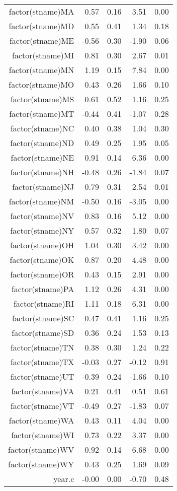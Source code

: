 \begin{table}[ht]
\begin{tabular}{rrrrr}
  factor(stname)MA & 0.57 & 0.16 & 3.51 & 0.00 \\ 
  factor(stname)MD & 0.55 & 0.41 & 1.34 & 0.18 \\ 
  factor(stname)ME & -0.56 & 0.30 & -1.90 & 0.06 \\ 
  factor(stname)MI & 0.81 & 0.30 & 2.67 & 0.01 \\ 
  factor(stname)MN & 1.19 & 0.15 & 7.84 & 0.00 \\ 
  factor(stname)MO & 0.43 & 0.26 & 1.66 & 0.10 \\ 
  factor(stname)MS & 0.61 & 0.52 & 1.16 & 0.25 \\ 
  factor(stname)MT & -0.44 & 0.41 & -1.07 & 0.28 \\ 
  factor(stname)NC & 0.40 & 0.38 & 1.04 & 0.30 \\ 
  factor(stname)ND & 0.49 & 0.25 & 1.95 & 0.05 \\ 
  factor(stname)NE & 0.91 & 0.14 & 6.36 & 0.00 \\ 
  factor(stname)NH & -0.48 & 0.26 & -1.84 & 0.07 \\ 
  factor(stname)NJ & 0.79 & 0.31 & 2.54 & 0.01 \\ 
  factor(stname)NM & -0.50 & 0.16 & -3.05 & 0.00 \\ 
  factor(stname)NV & 0.83 & 0.16 & 5.12 & 0.00 \\ 
  factor(stname)NY & 0.57 & 0.32 & 1.80 & 0.07 \\ 
  factor(stname)OH & 1.04 & 0.30 & 3.42 & 0.00 \\ 
  factor(stname)OK & 0.87 & 0.20 & 4.48 & 0.00 \\ 
  factor(stname)OR & 0.43 & 0.15 & 2.91 & 0.00 \\ 
  factor(stname)PA & 1.12 & 0.26 & 4.31 & 0.00 \\ 
  factor(stname)RI & 1.11 & 0.18 & 6.31 & 0.00 \\ 
  factor(stname)SC & 0.47 & 0.41 & 1.16 & 0.25 \\ 
  factor(stname)SD & 0.36 & 0.24 & 1.53 & 0.13 \\ 
  factor(stname)TN & 0.38 & 0.30 & 1.24 & 0.22 \\ 
  factor(stname)TX & -0.03 & 0.27 & -0.12 & 0.91 \\ 
  factor(stname)UT & -0.39 & 0.24 & -1.66 & 0.10 \\ 
  factor(stname)VA & 0.21 & 0.41 & 0.51 & 0.61 \\ 
  factor(stname)VT & -0.49 & 0.27 & -1.83 & 0.07 \\ 
  factor(stname)WA & 0.43 & 0.11 & 4.04 & 0.00 \\ 
  factor(stname)WI & 0.73 & 0.22 & 3.37 & 0.00 \\ 
  factor(stname)WV & 0.92 & 0.14 & 6.68 & 0.00 \\ 
  factor(stname)WY & 0.43 & 0.25 & 1.69 & 0.09 \\ 
  year.c & -0.00 & 0.00 & -0.70 & 0.48 \\ 
   \hline
\end{tabular}
\end{table}
